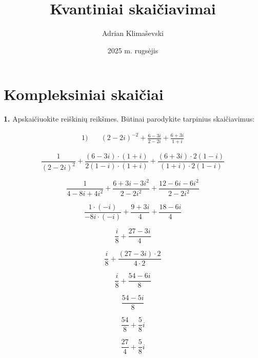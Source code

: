 \documentclass{article}
\title{Kvantiniai skaičiavimai}
\author{Adrian Klimaševski}
\date{2025 m. rugsėjis}
\begin{document}
\maketitle

\section*{Kompleksiniai skaičiai}

\textbf{1.} Apskaičiuokite reiškinių reikšmes. Būtinai parodykite tarpinius skaičiavimus:

\begin{align}
\text{1)}\quad &(2-2i)^{-2} + \frac{6-3i}{2-2i} + \frac{6+3i}{1+i}\nonumber
\end{align}


\begin{equation}
\frac{1}{(2-2i)^2} + \frac{(6-3i) \cdot (1+i)}{2(1-i) \cdot (1+i)} + \frac{(6+3i) \cdot 2(1-i)}{(1+i) \cdot 2(1-i)}\tag{1}
\end{equation}

\begin{equation}
\frac{1}{4-8i+4i^2} + \frac{6+3i-3i^2}{2-2i^2} + \frac{12-6i-6i^2}{2-2i^2}\tag{2}
\end{equation}

\begin{equation}
\frac{1 \cdot (-i)}{-8i \cdot (-i)} + \frac{9+3i}{4} + \frac{18-6i}{4}\tag{3}
\end{equation}

\begin{equation}
\frac{i}{8} + \frac{27-3i}{4}\tag{4}
\end{equation}

\begin{equation}
\frac{i}{8} + \frac{(27-3i) \cdot 2}{4 \cdot 2}\tag{5}
\end{equation}

\begin{equation}
\frac{i}{8} + \frac{54-6i}{8}\tag{6}
\end{equation}

\begin{equation}
\frac{54-5i}{8}\tag{7}
\end{equation}

\begin{equation}
\frac{54}{8}+\frac{5}{8}i\tag{8}
\end{equation}

\begin{equation*}
\frac{27}{4}+\frac{5}{8}i
\end{equation*}
\end{document}
